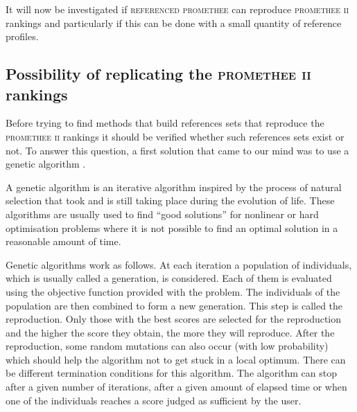 It will now be investigated if \textsc{referenced promethee} can reproduce \textsc{promethee ii} rankings and particularly if this can be done with a small quantity of reference profiles.

\subsection{Possibility of replicating the \textsc{promethee ii} rankings}
\label{sec:genetic_alg}

Before trying to find methods that build references sets that reproduce the \textsc{promethee ii} rankings it should be verified whether such references sets exist or not.
To answer this question, a first solution that came to our mind was to use a genetic algorithm \cite{Whitley1994}. 

A genetic algorithm is an iterative algorithm inspired by the process of natural selection that took and is still taking place during the evolution of life.
These algorithms are usually used to find ``good solutions'' for nonlinear or hard optimisation problems where it is not possible to find an optimal solution in a reasonable amount of time.

Genetic algorithms work as follows.
At each iteration a population of individuals, which is usually called a generation, is considered.
Each of them is evaluated using the objective function provided with the problem.
The individuals of the population are then combined to form a new generation.
This step is called the reproduction.
Only those with the best scores are selected for the reproduction and the higher the score they obtain, the more they will reproduce.
After the reproduction, some random mutations can also occur (with low probability) which should help the algorithm not to get stuck in a local optimum.
There can be different termination conditions for this algorithm. The algorithm can stop after a given number of iterations, after a given amount of elapsed time or when one of the individuals reaches a score judged as sufficient by the user.

